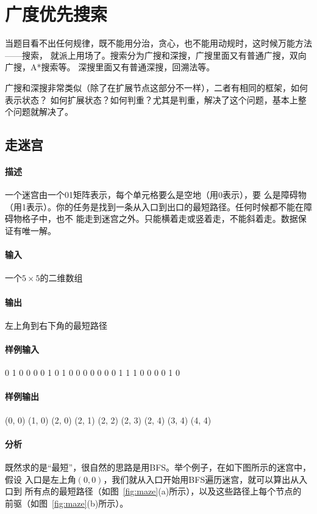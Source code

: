 \chapter{广度优先搜索}
当题目看不出任何规律，既不能用分治，贪心，也不能用动规时，这时候万能方法——搜索，
就派上用场了。搜索分为广搜和深搜，广搜里面又有普通广搜，双向广搜，A*搜索等。
深搜里面又有普通深搜，回溯法等。

广搜和深搜非常类似（除了在扩展节点这部分不一样），二者有相同的框架，如何表示状态？
如何扩展状态？如何判重？尤其是判重，解决了这个问题，基本上整个问题就解决了。


\section{走迷宫} %

\subsubsection{描述}
一个迷宫由一个01矩阵表示，每个单元格要么是空地（用0表示），要
么是障碍物（用1表示）。你的任务是找到一条从入口到出口的最短路径。任何时候都不能在障碍物格子中，也不
能走到迷宫之外。只能横着走或竖着走，不能斜着走。数据保证有唯一解。

\subsubsection{输入}
一个$5 \times 5$的二维数组

\subsubsection{输出}
左上角到右下角的最短路径

\subsubsection{样例输入}
\begin{Code}
0 1 0 0 0
0 1 0 1 0
0 0 0 0 0
0 1 1 1 0
0 0 0 1 0
\end{Code}

\subsubsection{样例输出}
(0, 0)
(1, 0)
(2, 0)
(2, 1)
(2, 2)
(2, 3)
(2, 4)
(3, 4)
(4, 4)

\subsubsection{分析}
既然求的是“最短”，很自然的思路是用BFS。举个例子，在如下图所示的迷宫中，假设
入口是左上角$(0,0)$，我们就从入口开始用BFS遍历迷宫，就可以算出从入口到
所有点的最短路径（如图~\ref{fig:maze}(a)所示），以及这些路径上每个节点的
前驱（如图~\ref{fig:maze}(b)所示）。

